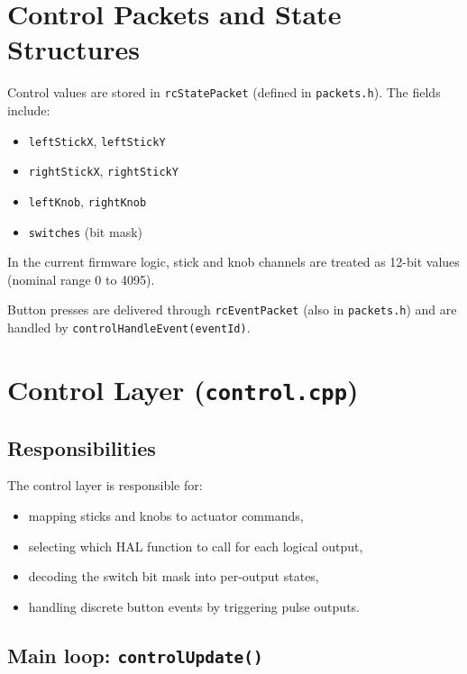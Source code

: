 \section{Control Packets and State Structures}
\label{sec:control-hal-packets}

Control values are stored in \texttt{rcStatePacket} (defined in \texttt{packets.h}).
The fields include:

\begin{itemize}
    \item \texttt{leftStickX}, \texttt{leftStickY}
    \item \texttt{rightStickX}, \texttt{rightStickY}
    \item \texttt{leftKnob}, \texttt{rightKnob}
    \item \texttt{switches} (bit mask)
\end{itemize}

In the current firmware logic, stick and knob channels are treated as 12-bit values (nominal range 0 to 4095).

Button presses are delivered through \texttt{rcEventPacket} (also in \texttt{packets.h}) and are handled by
\texttt{controlHandleEvent(eventId)}.

\section{Control Layer (\texttt{control.cpp})}
\label{sec:control-hal-control-layer}

\subsection{Responsibilities}
\label{subsec:control-hal-control-resp}

The control layer is responsible for:

\begin{itemize}
    \item mapping sticks and knobs to actuator commands,
    \item selecting which HAL function to call for each logical output,
    \item decoding the switch bit mask into per-output states,
    \item handling discrete button events by triggering pulse outputs.
\end{itemize}

\subsection{Main loop: \texttt{controlUpdate()}}
\label{subsec:control-hal-controlUpdate}

